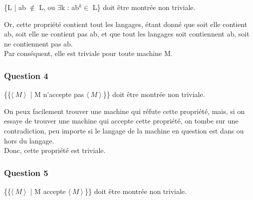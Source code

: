 \{L | ab $\not\in$ L, ou $\exists$k :
ab$^k\in$ L\} doit \^etre montr\'ee
non triviale.

Or, cette propri\'et\'e contient tout
les langages, \'etant donn\'e
que soit elle contient ab, soit elle ne
contient pas ab, et que tout les langages
soit contiennent ab, soit ne contiennent
pas ab.\\
Par cons\'equent, elle est triviale
pour toute machine M.

\subsubsection{Question 4}
\{\{$\langle\ M\ \rangle \!\ $
| M n'accepte pas
$\langle\ M\ \rangle \!\ $\}\}
doit \^etre montr\'ee non triviale.

On peux facilement trouver une machine
qui r\'efute cette propri\'et\'e, mais,
si on essaye de trouver une machine
qui accepte cette propri\'et\'e,
on tombe sur une contradiction,
peu importe si le langage de la machine
en question est dans ou hors du langage.\\
Donc, cette propri\'et\'e est triviale.

\subsubsection{Question 5}
\{\{$\langle\ M\ \rangle \!\ $
| M accepte $\langle\ M\ \rangle \!\ $\}\}
doit \^etre montr\'ee non triviale.
